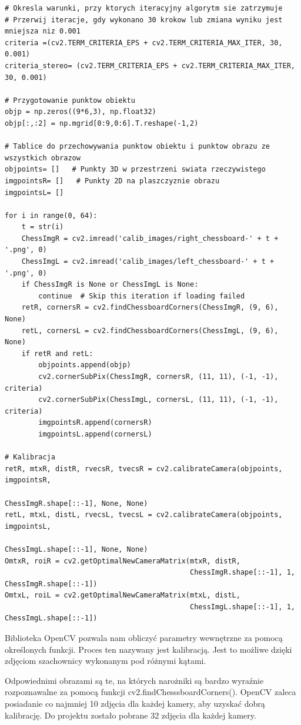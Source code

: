 \documentclass[magisterska]{pracadypl}
\begin{document}
\begin{lstlisting}[style=mypython]
# Okresla warunki, przy ktorych iteracyjny algorytm sie zatrzymuje
# Przerwij iteracje, gdy wykonano 30 krokow lub zmiana wyniku jest mniejsza niz 0.001
criteria =(cv2.TERM_CRITERIA_EPS + cv2.TERM_CRITERIA_MAX_ITER, 30, 0.001)
criteria_stereo= (cv2.TERM_CRITERIA_EPS + cv2.TERM_CRITERIA_MAX_ITER, 30, 0.001)

# Przygotowanie punktow obiektu
objp = np.zeros((9*6,3), np.float32)
objp[:,:2] = np.mgrid[0:9,0:6].T.reshape(-1,2)

# Tablice do przechowywania punktow obiektu i punktow obrazu ze wszystkich obrazow
objpoints= []   # Punkty 3D w przestrzeni swiata rzeczywistego
imgpointsR= []   # Punkty 2D na plaszczyznie obrazu
imgpointsL= []

for i in range(0, 64):
    t = str(i)
    ChessImgR = cv2.imread('calib_images/right_chessboard-' + t + '.png', 0)
    ChessImgL = cv2.imread('calib_images/left_chessboard-' + t + '.png', 0)
    if ChessImgR is None or ChessImgL is None:
        continue  # Skip this iteration if loading failed
    retR, cornersR = cv2.findChessboardCorners(ChessImgR, (9, 6), None)
    retL, cornersL = cv2.findChessboardCorners(ChessImgL, (9, 6), None)
    if retR and retL:
        objpoints.append(objp)
        cv2.cornerSubPix(ChessImgR, cornersR, (11, 11), (-1, -1), criteria)
        cv2.cornerSubPix(ChessImgL, cornersL, (11, 11), (-1, -1), criteria)
        imgpointsR.append(cornersR)
        imgpointsL.append(cornersL)

# Kalibracja
retR, mtxR, distR, rvecsR, tvecsR = cv2.calibrateCamera(objpoints, imgpointsR,
                                                        ChessImgR.shape[::-1], None, None)
retL, mtxL, distL, rvecsL, tvecsL = cv2.calibrateCamera(objpoints, imgpointsL, 
                                                        ChessImgL.shape[::-1], None, None)
OmtxR, roiR = cv2.getOptimalNewCameraMatrix(mtxR, distR, 
                                            ChessImgR.shape[::-1], 1, ChessImgR.shape[::-1])
OmtxL, roiL = cv2.getOptimalNewCameraMatrix(mtxL, distL, 
                                            ChessImgL.shape[::-1], 1, ChessImgL.shape[::-1])
\end{lstlisting}

Biblioteka OpenCV pozwala nam obliczyć parametry wewnętrzne za pomocą określonych funkcji.
Proces ten nazywany jest kalibracją. Jest to możliwe dzięki zdjęciom szachownicy wykonanym pod różnymi kątami.

Odpowiednimi obrazami są te, na których narożniki są bardzo wyraźnie rozpoznawalne za pomocą funkcji cv2.findChesssboardCorners(). OpenCV zaleca posiadanie co najmniej 10
zdjęcia dla każdej kamery, aby uzyskać dobrą kalibrację. Do projektu zostało pobrane 32 zdjęcia dla każdej kamery.
\end{document}
